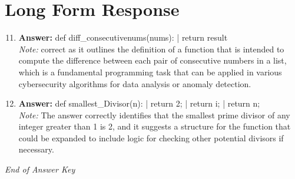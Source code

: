 \documentclass[12pt]{article}
\begin{document}
\section*{Long Form Response}
\begin{enumerate}[label=\arabic*.]
\setcounter{enumi}{10}
\item \textbf{Answer:} def diff\_consecutivenums(nums): | return result
\\ \textit{Note:} correct as it outlines the definition of a function that is intended to compute the difference between each pair of consecutive numbers in a list, which is a fundamental programming task that can be applied in various cybersecurity algorithms for data analysis or anomaly detection.
\item \textbf{Answer:} def smallest\_Divisor(n): | return 2; | return i; | return n;
\\ \textit{Note:} The answer correctly identifies that the smallest prime divisor of any integer greater than 1 is 2, and it suggests a structure for the function that could be expanded to include logic for checking other potential divisors if necessary.
\end{enumerate}

\vfill
\noindent\textit{End of Answer Key}
\end{document}

